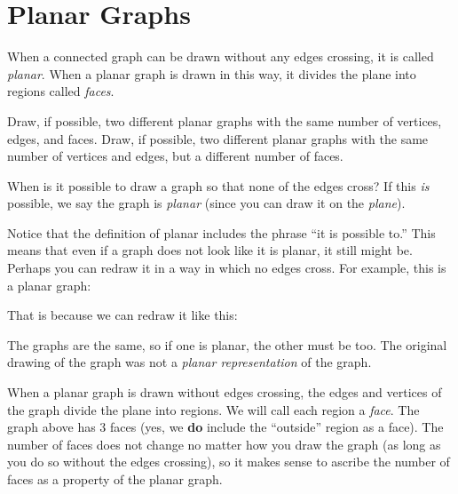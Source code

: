 \documentclass[12pt]{article}
\begin{document}
\section{Planar Graphs}


\begin{activity}
When a connected graph can be drawn without any edges crossing, it is called {\em planar}.  When a planar graph is drawn in this way, it divides the plane into regions called {\em faces}.
\begin{questions}
\question Draw, if possible, two different planar graphs with the same number of vertices, edges, and faces.
\question Draw, if possible, two different planar graphs with the same number of vertices and edges, but a different number of faces.
\end{questions}
\end{activity}

When is it possible to draw a graph so that none of the edges cross? If this \emph{is} possible, we say the graph is \emph{planar} (since you can draw it on the \emph{plane}).  

Notice that the definition of planar includes the phrase ``it is possible to.''  This means that even if a graph does not look like it is planar, it still might be.  Perhaps you can redraw it in a way in which no edges cross.  For example, this is a planar graph:

\begin{center}

\end{center}

That is because we can redraw it like this:

\begin{center}
\end{center}

The graphs are the same, so if one is planar, the other must be too.  The original drawing of the graph was not a {\em planar representation} of the graph.

When a planar graph is drawn without edges crossing, the edges and vertices of the graph divide the plane into regions.  We will call each region a {\em face}.  The graph above has 3 faces (yes, we \textbf{do} include the ``outside'' region as a face).  The number of faces does not change no matter how you draw the graph (as long as you do so without the edges crossing), so it makes sense to ascribe the number of faces as a property of the planar graph.
\end{document}
